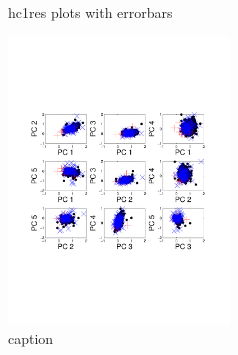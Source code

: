 
\begin{figure}[htbp]
	\centering
	\caption{hc1res plots with errorbars}
	\label{fig:pairs}
\end{figure}


\begin{figure}[htbp]
	\centering
		\includegraphics[height=3in]{../figs/new/pairs.pdf}
	\caption{caption}
	\label{fig:pairs}
\end{figure}
